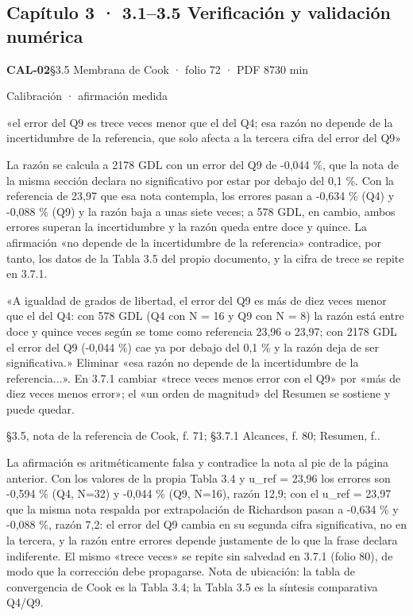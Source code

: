 \subsection{Capítulo 3 · 3.1–3.5 Verificación y validación numérica}
\noindent\casilla\textbf{CAL-02}\quad{}\quad §3.5 Membrana de Cook · folio 72 · PDF 87\hfill 30 min\par\vspace{1pt}
{\small\color{gris}Calibración · afirmación medida}\par
\begin{dice}«el error del Q9 es trece veces menor que el del Q4; esa razón no depende de la incertidumbre de la referencia, que solo afecta a la tercera cifra del error del Q9»\end{dice}
{\small{}La razón se calcula a 2178 GDL con un error del Q9 de -0,044 \%, que la nota de la misma sección declara no significativo por estar por debajo del 0,1 \%. Con la referencia de 23,97 que esa nota contempla, los errores pasan a -0,634 \% (Q4) y -0,088 \% (Q9) y la razón baja a unas siete veces; a 578 GDL, en cambio, ambos errores superan la incertidumbre y la razón queda entre doce y quince. La afirmación «no depende de la incertidumbre de la referencia» contradice, por tanto, los datos de la Tabla 3.5 del propio documento, y la cifra de trece se repite en 3.7.1.\par}
\begin{debedecir}«A igualdad de grados de libertad, el error del Q9 es más de diez veces menor que el del Q4: con 578 GDL (Q4 con N = 16 y Q9 con N = 8) la razón está entre doce y quince veces según se tome como referencia 23,96 o 23,97; con 2178 GDL el error del Q9 (-0,044 \%) cae ya por debajo del 0,1 \% y la razón deja de ser significativa.» Eliminar «esa razón no depende de la incertidumbre de la referencia...». En 3.7.1 cambiar «trece veces menos error con el Q9» por «más de diez veces menos error»; el «un orden de magnitud» del Resumen se sostiene y puede quedar.\end{debedecir}
{\small{}§3.5, nota de la referencia de Cook, f. 71; §3.7.1 Alcances, f. 80; Resumen, f..\par}
{\small\color{gris}La afirmación es aritméticamente falsa y contradice la nota al pie de la página anterior. Con los valores de la propia Tabla 3.4 y u\_\allowbreak{}ref = 23,96 los errores son -0,594 \% (Q4, N=32) y -0,044 \% (Q9, N=16), razón 12,9; con el u\_\allowbreak{}ref = 23,97 que la misma nota respalda por extrapolación de Richardson pasan a -0,634 \% y -0,088 \%, razón 7,2: el error del Q9 cambia en su segunda cifra significativa, no en la tercera, y la razón entre errores depende justamente de lo que la frase declara indiferente. El mismo «trece veces» se repite sin salvedad en 3.7.1 (folio 80), de modo que la corrección debe propagarse. Nota de ubicación: la tabla de convergencia de Cook es la Tabla 3.4; la Tabla 3.5 es la síntesis comparativa Q4/\allowbreak{}Q9.\par}
\vspace{6pt}
